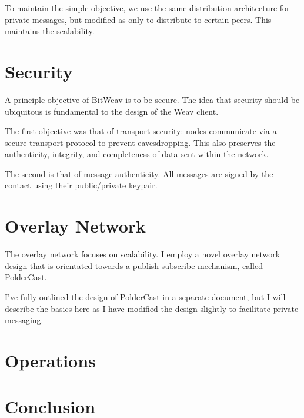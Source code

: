 \documentclass[10pt,a4paper,onecolumn]{article}
\begin{document}
To maintain the simple objective, we use the same distribution architecture for private messages, but modified as only to distribute to certain peers. This maintains the scalability. 

\section{Security}
A principle objective of BitWeav is to be secure. The idea that security should be ubiquitous is fundamental to the design of the Weav client.

The first objective was that of transport security: nodes communicate via a secure transport protocol to prevent eavesdropping. This also preserves the authenticity, integrity, and completeness of data sent within the network.

The second is that of message authenticity. All messages are signed by the contact using their public/private keypair. 

\section{Overlay Network}
The overlay network focuses on scalability. I employ a novel overlay network design that is orientated towards a publish-subscribe mechanism, called PolderCast.

I've fully outlined the design of PolderCast in a separate document\cite{PolderCastDesignOutline}, but I will describe the basics here as I have modified the design slightly to facilitate private messaging.

\section{Operations}

\section{Conclusion}


\end{document}

